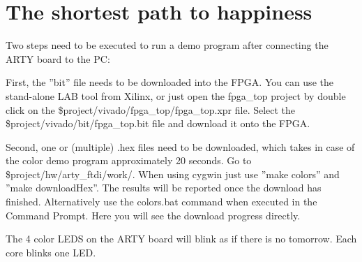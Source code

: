 \chapter{The shortest path to happiness}
\label{atomics}

Two steps need to be executed to run a demo program after connecting the ARTY board to the PC:

First, the ''bit'' file needs to be downloaded into the FPGA. You can use the stand-alone LAB tool from Xilinx, or just open the fpga\_top project by double click on the \$project/vivado/fpga\_top/fpga\_top.xpr file. Select the \$project/vivado/bit/fpga\_top.bit file and download it onto the FPGA.

Second, one or (multiple) .hex files need to be downloaded, which takes in case of the color demo program approximately 20 seconds. Go to \$project/hw/arty\_ftdi/work/. When using cygwin just use ''make colors'' and ''make downloadHex''. The results will be reported once the download has finished. Alternatively use the colors.bat command when executed in the Command Prompt. Here you will see the download progress directly.

The 4 color LEDS on the ARTY board will blink as if there is no tomorrow. Each core blinks one LED.



